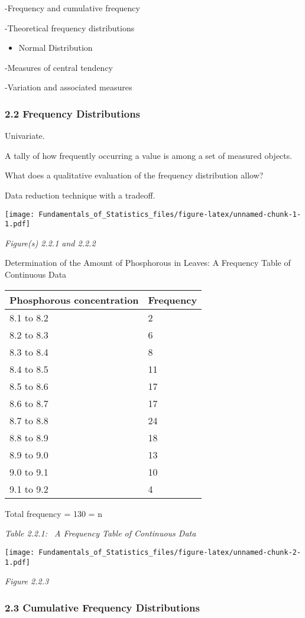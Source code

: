 \documentclass[]{article}
\providecommand{\tightlist}{%
  \setlength{\itemsep}{0pt}\setlength{\parskip}{0pt}}
\begin{document}
-Frequency and cumulative frequency

-Theoretical frequency distributions

\begin{itemize}
\tightlist
\item
  Normal Distribution
\end{itemize}

-Measures of central tendency

-Variation and associated measures

\hypertarget{frequency-distributions-1}{%
\subsubsection{2.2 Frequency
Distributions}\label{frequency-distributions-1}}

Univariate.

A tally of how frequently occurring a value is among a set of measured
objects.

What does a qualitative evaluation of the frequency distribution allow?

Data reduction technique with a tradeoff.

\texttt{[image: Fundamentals\_of\_Statistics\_files/figure-latex/unnamed-chunk-1-1.pdf]}

\emph{Figure(s) 2.2.1 and 2.2.2}

Determination of the Amount of Phosphorous in Leaves: A Frequency Table
of Continuous Data

\begin{longtable}[]{@{}ll@{}}
\toprule
Phosphorous concentration & Frequency\tabularnewline
\midrule
\endhead
8.1 to 8.2 & 2\tabularnewline
8.2 to 8.3 & 6\tabularnewline
8.3 to 8.4 & 8\tabularnewline
8.4 to 8.5 & 11\tabularnewline
8.5 to 8.6 & 17\tabularnewline
8.6 to 8.7 & 17\tabularnewline
8.7 to 8.8 & 24\tabularnewline
8.8 to 8.9 & 18\tabularnewline
8.9 to 9.0 & 13\tabularnewline
9.0 to 9.1 & 10\tabularnewline
9.1 to 9.2 & 4\tabularnewline
\bottomrule
\end{longtable}

Total frequency = 130 = n

\emph{Table 2.2.1: ~A Frequency Table of Continuous Data}

\texttt{[image: Fundamentals\_of\_Statistics\_files/figure-latex/unnamed-chunk-2-1.pdf]}

\emph{Figure 2.2.3}

\hypertarget{cumulative-frequency-distributions}{%
\subsubsection{2.3 Cumulative Frequency
Distributions}\label{cumulative-frequency-distributions}}
\end{document}
